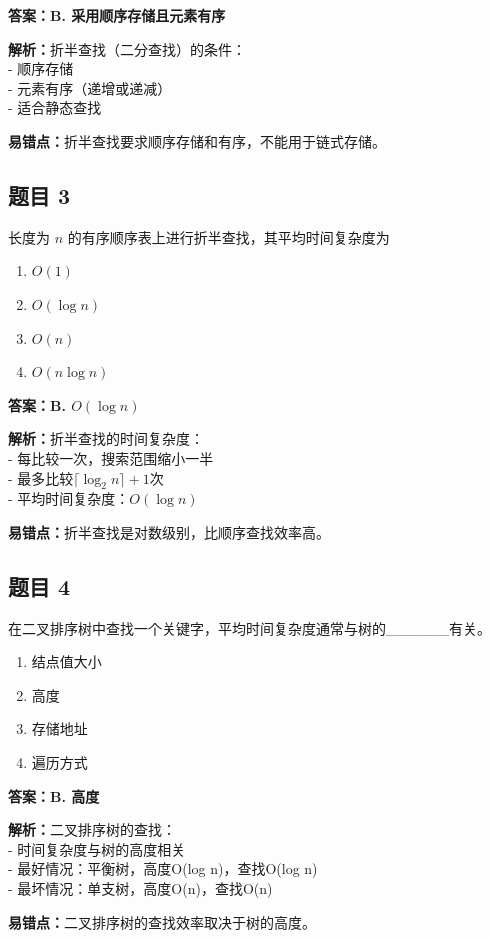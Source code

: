 \documentclass[12pt,a4paper]{ctexart}
\begin{document}
\begin{answerbox}
	\textbf{答案：B. 采用顺序存储且元素有序}

	\textbf{解析：}折半查找（二分查找）的条件：\\
	- 顺序存储\\
	- 元素有序（递增或递减）\\
	- 适合静态查找

	\textbf{易错点：}折半查找要求顺序存储和有序，不能用于链式存储。
\end{answerbox}

\subsection*{题目 3}
长度为 $n$ 的有序顺序表上进行折半查找，其平均时间复杂度为
\begin{enumerate}[label=\Alph*.]
	\item $O(1)$
	\item $O(\log n)$
	\item $O(n)$
	\item $O(n\log n)$
\end{enumerate}

\begin{answerbox}
	\textbf{答案：B. $O(\log n)$}

	\textbf{解析：}折半查找的时间复杂度：\\
	- 每比较一次，搜索范围缩小一半\\
	- 最多比较$\lceil \log_2 n \rceil + 1$次\\
	- 平均时间复杂度：$O(\log n)$

	\textbf{易错点：}折半查找是对数级别，比顺序查找效率高。
\end{answerbox}

\subsection*{题目 4}
在二叉排序树中查找一个关键字，平均时间复杂度通常与树的\_\_\_\_\_\_有关。
\begin{enumerate}[label=\Alph*.]
	\item 结点值大小
	\item 高度
	\item 存储地址
	\item 遍历方式
\end{enumerate}

\begin{answerbox}
	\textbf{答案：B. 高度}

	\textbf{解析：}二叉排序树的查找：\\
	- 时间复杂度与树的高度相关\\
	- 最好情况：平衡树，高度O(log n)，查找O(log n)\\
	- 最坏情况：单支树，高度O(n)，查找O(n)

	\textbf{易错点：}二叉排序树的查找效率取决于树的高度。
\end{answerbox}
\end{document}
